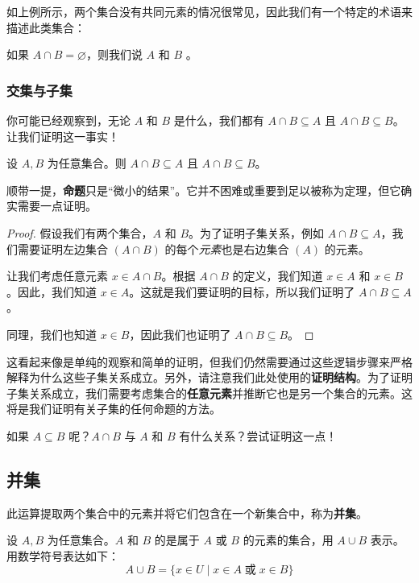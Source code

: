 如上例所示，两个集合没有共同元素的情况很常见，因此我们有一个特定的术语来描述此类集合：

\begin{definition}
    如果 $A \cap B = \varnothing$，则我们说 $A$ 和 $B$ 。
\end{definition}

\subsubsection*{交集与子集}

你可能已经观察到，无论 $A$ 和 $B$ 是什么，我们都有 $A \cap B \subseteq A$ 且 $A \cap B \subseteq B$。让我们证明这一事实！

\begin{proposition}
    设 $A, B$ 为任意集合。则 $A \cap B \subseteq A$ 且 $A \cap B \subseteq B$。
\end{proposition}

顺带一提，\textbf{命题}只是``微小的结果''。它并不困难或重要到足以被称为定理，但它确实需要一点证明。

\begin{proof}
    假设我们有两个集合，$A$ 和 $B$。为了证明子集关系，例如 $A \cap B \subseteq A$，我们需要证明左边集合 $(A \cap B)$ 的每个\emph{元素}也是右边集合 $(A)$ 的元素。

    让我们考虑任意元素 $x \in A \cap B$。根据 $A \cap B$ 的定义，我们知道 $x \in A$ 和 $x \in B$。因此，我们知道 $x \in A$。这就是我们要证明的目标，所以我们证明了 $A \cap B \subseteq A$。

    同理，我们也知道 $x \in B$，因此我们也证明了 $A \cap B \subseteq B$。
\end{proof}

这看起来像是单纯的观察和简单的证明，但我们仍然需要通过这些逻辑步骤来严格解释为什么这些子集关系成立。另外，请注意我们此处使用的\textbf{证明结构}。为了证明子集关系成立，我们需要考虑集合的\textbf{任意元素}并推断它也是另一个集合的元素。这将是我们证明有关子集的任何命题的方法。

如果 $A \subseteq B$ 呢？$A \cap B$ 与 $A$ 和 $B$ 有什么关系？尝试证明这一点！

\subsection{并集}

此运算提取两个集合中的元素并将它们包含在一个新集合中，称为\textbf{并集}。

\begin{definition}
    设 $A, B$ 为任意集合。$A$ 和 $B$ 的是属于 $A$ 或 $B$ 的元素的集合，用 $A \cup B$ 表示。用数学符号表达如下：
    \[A \cup B = \{x \in U \mid x \in A \;\text{或}\; x \in B\}\]
\end{definition}

